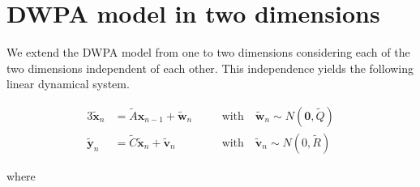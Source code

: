\documentclass[fleqn]{article}
\begin{document}
\section{DWPA model in two dimensions}
\label{sec:dwpaModel2D}

We extend the DWPA model from one to two dimensions considering each of the two
dimensions independent of each other. This independence yields the following
linear dynamical system.

\begin{alignat*}{3}
    \tilde{\mathbf{x}}_n &= \tilde{A}\mathbf{x}_{n-1} + \tilde{\mathbf{w}}_n && \quad \text{with} \quad\tilde{\mathbf{w}}_n\sim N(\mathbf{0}, \tilde{Q})\\
    \tilde{\mathbf{y}}_n &= \tilde{C}\tilde{\mathbf{x}}_{n} + \tilde{\mathbf{v}}_n && \quad \text{with} \quad \tilde{\mathbf{v}}_n\sim N(0, \tilde{R})
\end{alignat*}

\noindent where
\end{document}
